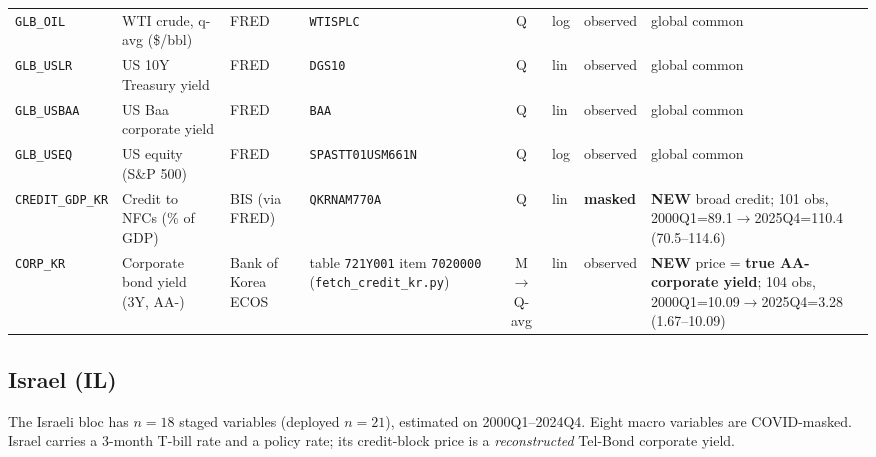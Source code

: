{\begin{longtable}{@{}lp{2.9cm}p{1.9cm}p{2.0cm}cp{1.4cm}p{1.7cm}p{2.6cm}@{}}
\texttt{GLB\_OIL} & WTI crude, q-avg (\$/bbl) & FRED & \texttt{WTISPLC} & Q & log & observed & global common\\
\texttt{GLB\_USLR} & US 10Y Treasury yield & FRED & \texttt{DGS10} & Q & lin & observed & global common\\
\texttt{GLB\_USBAA} & US Baa corporate yield & FRED & \texttt{BAA} & Q & lin & observed & global common\\
\texttt{GLB\_USEQ} & US equity (S\&P 500) & FRED & \texttt{SPASTT01USM661N} & Q & log & observed & global common\\
\texttt{CREDIT\_GDP\_KR} & Credit to NFCs (\% of GDP) & BIS (via FRED) & \texttt{QKRNAM770A} & Q & lin & \textbf{masked} & \textbf{NEW} broad credit; 101 obs, 2000Q1=89.1$\to$2025Q4=110.4 (70.5--114.6)\\
\texttt{CORP\_KR} & Corporate bond yield (3Y, AA-) & Bank of Korea ECOS & table \texttt{721Y001} item \texttt{7020000} (\texttt{fetch\_credit\_kr.py}) & M$\to$Q-avg & lin & observed & \textbf{NEW} price = \textbf{true AA- corporate yield}; 104 obs, 2000Q1=10.09$\to$2025Q4=3.28 (1.67--10.09)\\
\end{longtable}}

\subsection{Israel (IL)}\label{sec:data:IL}

The Israeli bloc has $n=18$ staged variables (deployed $n=21$), estimated on
2000Q1--2024Q4. Eight macro variables are COVID-masked. Israel carries a
3-month T-bill rate and a policy rate; its credit-block price is a
\emph{reconstructed} Tel-Bond corporate yield.

